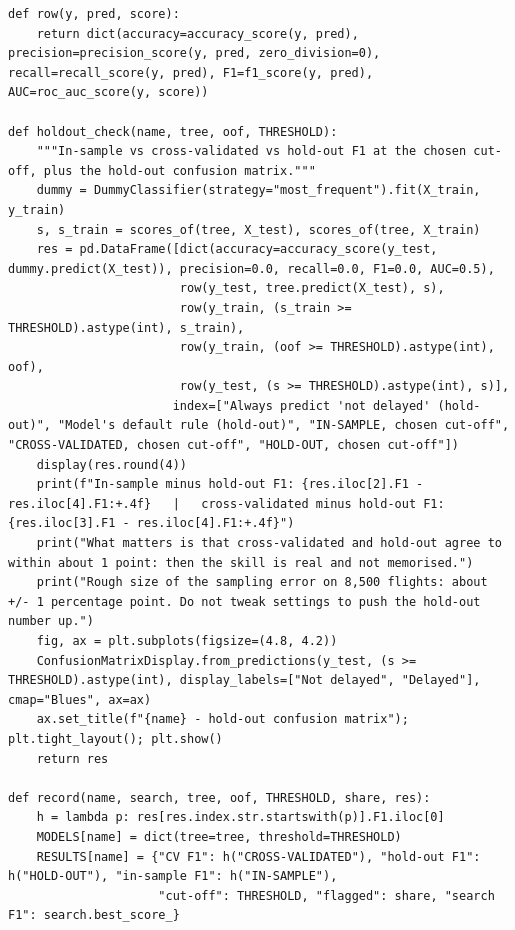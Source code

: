 \documentclass[12pt,a4paper]{article}
\begin{document}
\begin{lstlisting}[style=code]
def row(y, pred, score):
    return dict(accuracy=accuracy_score(y, pred), precision=precision_score(y, pred, zero_division=0), recall=recall_score(y, pred), F1=f1_score(y, pred), AUC=roc_auc_score(y, score))

def holdout_check(name, tree, oof, THRESHOLD):
    """In-sample vs cross-validated vs hold-out F1 at the chosen cut-off, plus the hold-out confusion matrix."""
    dummy = DummyClassifier(strategy="most_frequent").fit(X_train, y_train)
    s, s_train = scores_of(tree, X_test), scores_of(tree, X_train)
    res = pd.DataFrame([dict(accuracy=accuracy_score(y_test, dummy.predict(X_test)), precision=0.0, recall=0.0, F1=0.0, AUC=0.5),
                        row(y_test, tree.predict(X_test), s),
                        row(y_train, (s_train >= THRESHOLD).astype(int), s_train),
                        row(y_train, (oof >= THRESHOLD).astype(int), oof),
                        row(y_test, (s >= THRESHOLD).astype(int), s)],
                       index=["Always predict 'not delayed' (hold-out)", "Model's default rule (hold-out)", "IN-SAMPLE, chosen cut-off", "CROSS-VALIDATED, chosen cut-off", "HOLD-OUT, chosen cut-off"])
    display(res.round(4))
    print(f"In-sample minus hold-out F1: {res.iloc[2].F1 - res.iloc[4].F1:+.4f}   |   cross-validated minus hold-out F1: {res.iloc[3].F1 - res.iloc[4].F1:+.4f}")
    print("What matters is that cross-validated and hold-out agree to within about 1 point: then the skill is real and not memorised.")
    print("Rough size of the sampling error on 8,500 flights: about +/- 1 percentage point. Do not tweak settings to push the hold-out number up.")
    fig, ax = plt.subplots(figsize=(4.8, 4.2))
    ConfusionMatrixDisplay.from_predictions(y_test, (s >= THRESHOLD).astype(int), display_labels=["Not delayed", "Delayed"], cmap="Blues", ax=ax)
    ax.set_title(f"{name} - hold-out confusion matrix"); plt.tight_layout(); plt.show()
    return res

def record(name, search, tree, oof, THRESHOLD, share, res):
    h = lambda p: res[res.index.str.startswith(p)].F1.iloc[0]
    MODELS[name] = dict(tree=tree, threshold=THRESHOLD)
    RESULTS[name] = {"CV F1": h("CROSS-VALIDATED"), "hold-out F1": h("HOLD-OUT"), "in-sample F1": h("IN-SAMPLE"),
                     "cut-off": THRESHOLD, "flagged": share, "search F1": search.best_score_}
\end{lstlisting}
\end{document}
